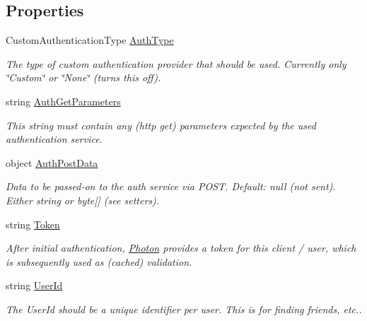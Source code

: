 \subsection*{Properties}
\begin{DoxyCompactItemize}
\item 
Custom\+Authentication\+Type \hyperlink{class_authentication_values_a6902d22f3f59653cac4ee895273ed5c5}{Auth\+Type}
\begin{DoxyCompactList}\small\item\em The type of custom authentication provider that should be used. Currently only \char`\"{}\+Custom\char`\"{} or \char`\"{}\+None\char`\"{} (turns this off).\end{DoxyCompactList}\item 
string \hyperlink{class_authentication_values_a960384fb735ced0be6ee2d3e365fd5aa}{Auth\+Get\+Parameters}
\begin{DoxyCompactList}\small\item\em This string must contain any (http get) parameters expected by the used authentication service. \end{DoxyCompactList}\item 
object \hyperlink{class_authentication_values_ae5df4bb87c20c0e83e1f13ca126a3b5f}{Auth\+Post\+Data}
\begin{DoxyCompactList}\small\item\em Data to be passed-\/on to the auth service via P\+O\+ST. Default\+: null (not sent). Either string or byte\mbox{[}\mbox{]} (see setters).\end{DoxyCompactList}\item 
string \hyperlink{class_authentication_values_a0fa90664bfe590fec56cf4f399ff26b2}{Token}
\begin{DoxyCompactList}\small\item\em After initial authentication, \hyperlink{namespace_photon}{Photon} provides a token for this client / user, which is subsequently used as (cached) validation.\end{DoxyCompactList}\item 
string \hyperlink{class_authentication_values_a60a4d92454c4b2bbca1f299631da2f94}{User\+Id}
\begin{DoxyCompactList}\small\item\em The User\+Id should be a unique identifier per user. This is for finding friends, etc..\end{DoxyCompactList}\end{DoxyCompactItemize}


